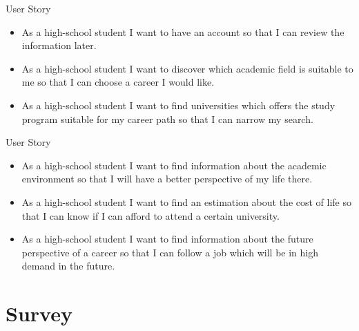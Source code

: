 \documentclass{beamer}
\begin{document}
\begin{frame}{User Story}
	
	\begin{itemize}
		\item As a high-school student I want to
		have an account so that I can review the 
		information later.
	\end{itemize}
	
	\begin{itemize}
		\item As a high-school student I want to
		discover which academic field is suitable to me so that I can choose a career I would like.
	\end{itemize}
	
	\begin{itemize}
		\item As a high-school student I want to find universities which offers the study program suitable for my career path so that I can narrow my search.
	\end{itemize}
	
\end{frame}


\begin{frame}{User Story}
	
	\begin{itemize}
		\item As a high-school student I want to
		find information about the academic environment so that I will have a better perspective of my life there.
	\end{itemize}
	
	\begin{itemize}
		\item As a high-school student I want to
		find an estimation about the cost of life
		so that I can know if I can afford to attend a certain university.
	\end{itemize}
	
	\begin{itemize}
		\item As a high-school student I want to find information about the future perspective of a career so that I can follow a job which will be in high demand in the future.
	\end{itemize}
	
\end{frame}
\section{Survey}
\end{document}
